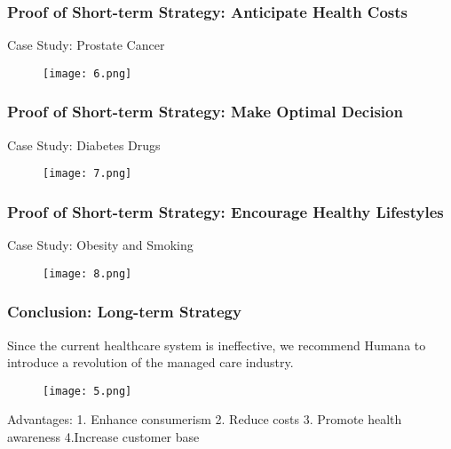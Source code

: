 \documentclass[compress,handout,10pt]{beamer}
\begin{document}
\begin{frame}[dresden]
   \frametitle{Proof of Short-term Strategy: \newline Anticipate Health Costs}
\begin{center}
Case Study: Prostate Cancer
\end{center}
\begin{figure}[h]
    \begin{center}
        \texttt{[image: 6.png]}
    \end{center}
    \caption{}
    \label{fig:seats}
\end{figure}
\end{frame}

\begin{frame}[dresden]
   \frametitle{Proof of Short-term Strategy: \newline  Make Optimal Decision}
\begin{center}
Case Study: Diabetes Drugs
\end{center}
\begin{figure}[h]
    \begin{center}
        \texttt{[image: 7.png]}
    \end{center}
    \caption{}
    \label{fig:seats}
\end{figure}
\end{frame}

\begin{frame}[dresden]
   \frametitle{Proof of Short-term Strategy: \newline Encourage Healthy Lifestyles}
\begin{center}
Case Study: Obesity and Smoking
\end{center}
\begin{figure}[h]
    \begin{center}
        \texttt{[image: 8.png]}
    \end{center}
    \caption{}
    \label{fig:seats}
\end{figure}
\end{frame}


\begin{frame}
    \frametitle{Conclusion: Long-term Strategy}
Since the current healthcare system is ineffective, we recommend Humana to introduce a revolution of the managed care industry.
\begin{figure}[h]
    \begin{center}
        \texttt{[image: 5.png]}
    \end{center}
    \caption{}
    \label{fig:seats}
\end{figure}  
    \begin{center}
Advantages: 1. Enhance consumerism 2. Reduce costs  3. Promote health awareness   4.Increase customer base
    \end{center}
\end{frame}
\end{document}
